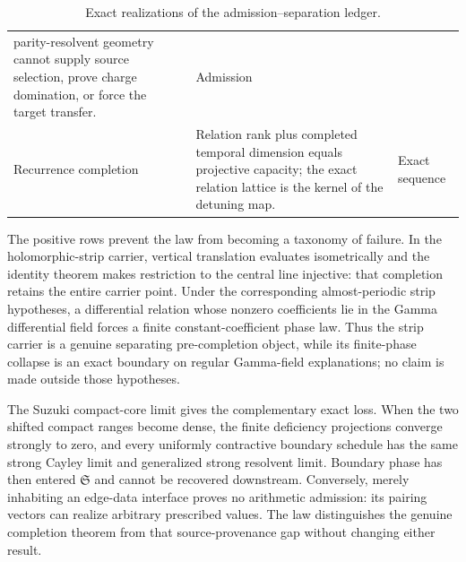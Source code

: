 \documentclass[11pt]{article}
\theoremstyle{definition}
\theoremstyle{remark}
\begin{document}
\begin{table}[ht]
\begin{tabular}{@{}>{\raggedright\arraybackslash}p{}
  >{\raggedright\arraybackslash}p{}
  >{\raggedright\arraybackslash}p{}@{}}
parity-resolvent geometry cannot supply source selection, prove charge domination, or force the
target transfer. & Admission\\
Recurrence completion & Relation rank plus completed temporal dimension equals projective
capacity; the exact relation lattice is the kernel of the detuning map. & Exact sequence\\
\bottomrule
\end{tabular}
\caption{Exact realizations of the admission--separation ledger.}
\end{table}

The positive rows prevent the law from becoming a taxonomy of failure.  In the holomorphic-strip
carrier, vertical translation evaluates isometrically and the identity theorem makes restriction
to the central line injective: that completion retains the entire carrier point.  Under the
corresponding almost-periodic strip hypotheses, a differential relation whose nonzero
coefficients lie in the Gamma differential field forces a finite constant-coefficient phase law.
Thus the strip carrier is a genuine separating pre-completion object, while its finite-phase
collapse is an exact boundary on regular Gamma-field explanations; no claim is made outside those
hypotheses.

The Suzuki compact-core limit gives the complementary exact loss.  When the two shifted compact
ranges become dense, the finite deficiency projections converge strongly to zero, and every
uniformly contractive boundary schedule has the same strong Cayley limit and generalized strong
resolvent limit.  Boundary phase has then entered $\mathfrak S$ and cannot be recovered
downstream.  Conversely, merely inhabiting an edge-data interface proves no arithmetic
admission: its pairing vectors can realize arbitrary prescribed values.  The law distinguishes
the genuine completion theorem from that source-provenance gap without changing either result.
\end{document}
